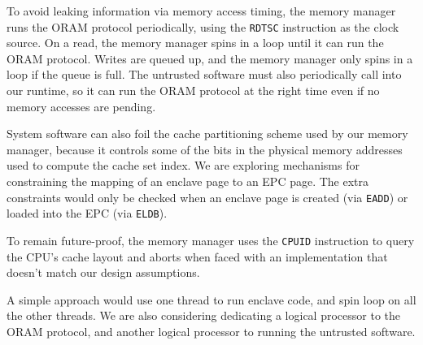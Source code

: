 To avoid leaking information via memory access timing, the memory manager
runs the ORAM protocol periodically, using the \texttt{RDTSC} instruction as
the clock source. On a read, the memory manager spins in a loop until it can
run the ORAM protocol. Writes are queued up, and the memory manager only spins
in a loop if the queue is full. The untrusted software must also periodically
call into our runtime, so it can run the ORAM protocol at the right time
even if no memory accesses are pending.

System software can also foil the cache partitioning scheme used by our memory
manager, because it controls some of the bits in the physical memory addresses
used to compute the cache set index. We are exploring mechanisms for
constraining the mapping of an enclave page to an EPC page. The extra
constraints would only be checked when an enclave page is created (via
\texttt{EADD}) or loaded into the EPC (via \texttt{ELDB}).

To remain future-proof, the memory manager uses the \texttt{CPUID} instruction
\cite{intel2013manual} to query the CPU's cache layout and aborts when faced
with an implementation that doesn't match our design assumptions.




A simple approach would use one
thread to run enclave code, and spin loop on all the other threads. We are
also considering dedicating a logical processor to the ORAM protocol, and
another logical processor to running the untrusted software.
